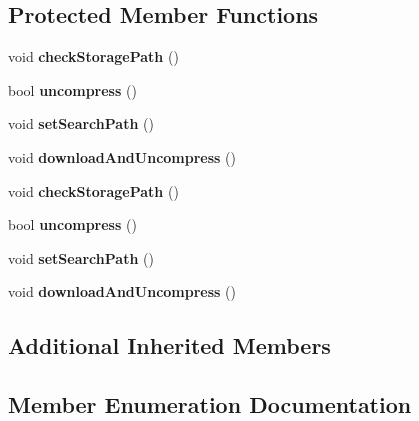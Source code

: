 \subsection*{Protected Member Functions}
\begin{DoxyCompactItemize}
\item 
\mbox{\label{classAssetsManager_a354738a2e589f87ba7eb5bbdddf6fa0c}} 
void {\bfseries check\+Storage\+Path} ()
\item 
\mbox{\label{classAssetsManager_a33ac76b5776ba6cced632b82f799ae8b}} 
bool {\bfseries uncompress} ()
\item 
\mbox{\label{classAssetsManager_ad0abdfde74514a74c0492faeeb151e5d}} 
void {\bfseries set\+Search\+Path} ()
\item 
\mbox{\label{classAssetsManager_a2cb09e2725e1905d276dbf3ec4a0d551}} 
void {\bfseries download\+And\+Uncompress} ()
\item 
\mbox{\label{classAssetsManager_a354738a2e589f87ba7eb5bbdddf6fa0c}} 
void {\bfseries check\+Storage\+Path} ()
\item 
\mbox{\label{classAssetsManager_a33ac76b5776ba6cced632b82f799ae8b}} 
bool {\bfseries uncompress} ()
\item 
\mbox{\label{classAssetsManager_ad0abdfde74514a74c0492faeeb151e5d}} 
void {\bfseries set\+Search\+Path} ()
\item 
\mbox{\label{classAssetsManager_a2cb09e2725e1905d276dbf3ec4a0d551}} 
void {\bfseries download\+And\+Uncompress} ()
\end{DoxyCompactItemize}
\subsection*{Additional Inherited Members}


\subsection{Member Enumeration Documentation}
\mbox{\label{classAssetsManager_a5e348d12e70204e183b449f8dec2577d}} 
